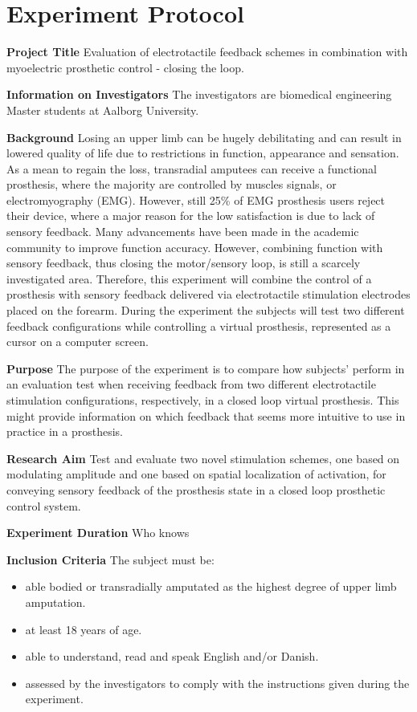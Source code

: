 \section{Experiment Protocol}

\textbf{Project Title}
Evaluation of electrotactile feedback schemes in combination with myoelectric prosthetic control - closing the loop. 

\textbf{Information on Investigators}
The investigators are biomedical engineering Master students at Aalborg University. 

\textbf{Background}
Losing an upper limb can be hugely debilitating and can result in lowered quality of life due to restrictions in function, appearance and sensation. As a mean to regain the loss, transradial amputees can receive a functional prosthesis, where the majority are controlled by muscles signals, or electromyography (EMG). However, still 25\% of EMG prosthesis users reject their device, where a major reason for the low satisfaction is due to lack of sensory feedback.
Many advancements have been made in the academic community to improve function accuracy. However, combining function with sensory feedback, thus closing the motor/sensory loop, is still a scarcely investigated area. Therefore, this experiment will combine the control of a prosthesis with sensory feedback delivered via electrotactile stimulation electrodes placed on the forearm. During the experiment the subjects will test two different feedback configurations while controlling a virtual prosthesis, represented as a cursor on a computer screen.  

\textbf{Purpose}
The purpose of the experiment is to compare how subjects' perform in an evaluation test when receiving feedback from two different electrotactile stimulation configurations, respectively, in a closed loop virtual prosthesis. This might provide information on which feedback that seems more intuitive to use in practice in a prosthesis.


\textbf{Research Aim}
Test and evaluate two novel stimulation schemes, one based on modulating amplitude and one based on spatial localization of activation, for conveying sensory feedback of the prosthesis state in a closed loop prosthetic control system.

\textbf{Experiment Duration}
Who knows

\textbf{Inclusion Criteria}
The subject must be:
\begin{itemize}
	\item able bodied or transradially amputated as the highest degree of upper limb amputation.
	\item at least 18 years of age.
	\item able to understand, read and speak English and/or Danish.
	\item assessed by the investigators to comply with the instructions given during the experiment.
\end{itemize}

